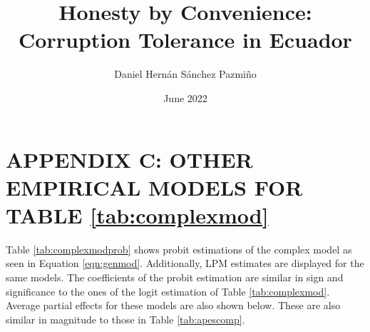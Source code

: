 \documentclass[12pt,a4]{article}
\title{Honesty by Convenience: Corruption Tolerance in Ecuador}
\author{Daniel Hernán Sánchez Pazmiño}
\date{June 2022}
\begin{document}

\section{APPENDIX C: OTHER EMPIRICAL MODELS FOR TABLE \ref{tab:complexmod}}
\label{app:third}

Table \ref{tab:complexmodprob} shows probit estimations of the complex model as seen in Equation \ref{eqn:genmod}. Additionally, LPM estimates are displayed for the same models. The coefficients of the probit estimation are similar in sign and significance to the ones of the logit estimation of Table \ref{tab:complexmod}. Average partial effects for these models are also shown below. These are also similar in magnitude to those in Table \ref{tab:apescomp}. 

\end{document}
